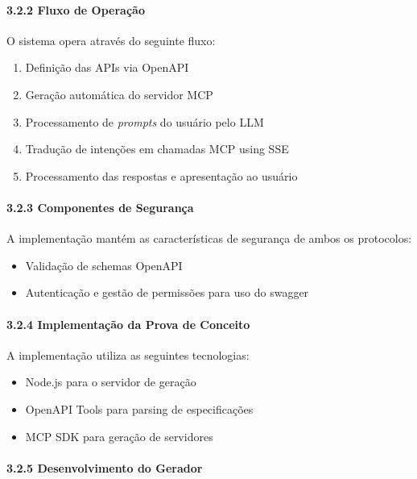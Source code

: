 \documentclass[
]{article}
\providecommand{\tightlist}{%
  \setlength{\itemsep}{0pt}\setlength{\parskip}{0pt}}
\begin{document}
\paragraph{3.2.2 Fluxo de Operação}\label{fluxo-de-operauxe7uxe3o}

O sistema opera através do seguinte fluxo:

\begin{enumerate}
\def\labelenumi{\arabic{enumi}.}
\tightlist
\item
  Definição das APIs via OpenAPI
\item
  Geração automática do servidor MCP
\item
  Processamento de \emph{prompts} do usuário pelo LLM
\item
  Tradução de intenções em chamadas MCP using SSE
\item
  Processamento das respostas e apresentação ao usuário
\end{enumerate}

\paragraph{3.2.3 Componentes de
Segurança}\label{componentes-de-seguranuxe7a-1}

A implementação mantém as características de segurança de ambos os
protocolos:

\begin{itemize}
\tightlist
\item
  Validação de schemas OpenAPI
\item
  Autenticação e gestão de permissões para uso do swagger
\end{itemize}

\paragraph{3.2.4 Implementação da Prova de
Conceito}\label{implementauxe7uxe3o-da-prova-de-conceito-1}

A implementação utiliza as seguintes tecnologias:

\begin{itemize}
\tightlist
\item
  Node.js para o servidor de geração
\item
  OpenAPI Tools para parsing de especificações
\item
  MCP SDK para geração de servidores
\end{itemize}

\paragraph{3.2.5 Desenvolvimento do
Gerador}\label{desenvolvimento-do-gerador}
\end{document}
